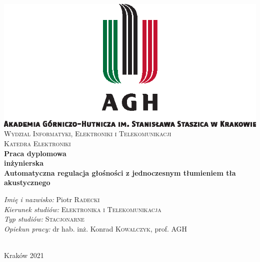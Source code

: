 \begin{titlepage}

\begin{center}

\includegraphics[scale=1.25]{agh_nzw_s_pl_1w_wbr_pms}\\[0.2cm]

\textsc{Wydzial Informatyki, Elektroniki i Telekomunikacji}\\[0.2cm]

\textsc{Katedra Elektroniki}\\[1cm]

\textbf{Praca dyplomowa \\ inżynierska}\\[1cm]

{\huge \bfseries Automatyczna regulacja głośności z jednoczesnym tłumieniem tła akustycznego}\\[1cm]



\vfill

\begin{minipage}{0.8\textwidth}
\begin{flushleft}
{\large \emph{Imię i nazwisko:} \hfill Piotr \textsc{Radecki}}\\[0.1cm]
{\large \emph{Kierunek studiów:} \hfill \textsc{Elektronika i Telekomunikacja}}\\[0.1cm]
{\large \emph{Typ studiów:} \hfill \textsc{Stacjonarne}}\\[0.1cm]
{\large \emph{Opiekun pracy:} \hfill dr hab. inż. Konrad \textsc{Kowalczyk}, prof. AGH}\\[0.1cm]
\end{flushleft}
\end{minipage}\\[2cm]

Kraków 2021

\end{center}

\end{titlepage}

